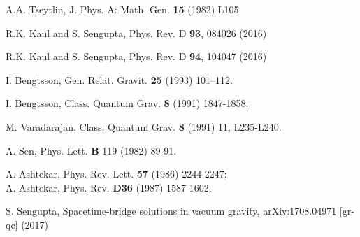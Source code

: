 \documentclass[preprint,aps,superscriptaddress,nofootinbib]{revtex4-1}
\begin{document}
\begin{thebibliography}{99}

  A.A. Tseytlin, J. Phys. A: Math. Gen. {\bf 15} 
(1982) L105.

 R.K. Kaul and S. Sengupta, Phys. Rev. D {\bf 93}, 
084026 (2016)

 R.K. Kaul and S. Sengupta, Phys. Rev. D {\bf 94}, 
104047 (2016)



 I. Bengtsson, Gen. Relat. Gravit. {\bf 25} (1993) 
101–112.

 I. Bengtsson, Class. Quantum Grav. {\bf 8} (1991) 
1847-1858.

 M. Varadarajan, Class. Quantum Grav. {\bf 8} (1991)
 11, L235-L240.
 
 A. Sen, Phys. Lett. {\bf B} 119 (1982) 89-91.

 A. Ashtekar, Phys. Rev. Lett. {\bf 57} (1986) 
2244-2247;\\
A. Ashtekar, Phys. Rev. {\bf D36} (1987) 1587-1602.

 
  S. Sengupta, Spacetime-bridge solutions in 
 vacuum gravity, arXiv:1708.04971 [gr-qc] (2017)











\end{thebibliography}
\end{document}

